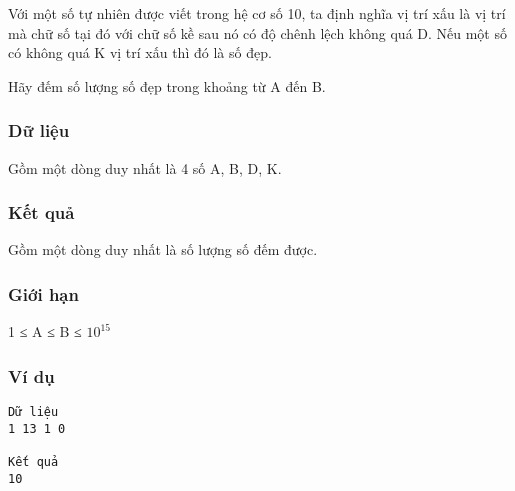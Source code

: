 



   Với một số tự nhiên được viết trong hệ cơ số 10, ta định nghĩa vị trí xấu là vị trí mà chữ số tại đó với chữ số kề sau nó có độ chênh lệch không quá D. Nếu một số có không quá K vị trí xấu thì đó là số đẹp.  

   Hãy đếm số lượng số đẹp trong khoảng từ A đến B.  

\subsubsection{   Dữ liệu  }

   Gồm một dòng duy nhất là 4 số A, B, D, K.  

\subsubsection{   Kết quả  }

   Gồm một dòng duy nhất là số lượng số đếm được.  

\subsubsection{   Giới hạn  }

   1 ≤ A ≤ B ≤ $10^{15}$

\subsubsection{   Ví dụ  }
\begin{verbatim}
Dữ liệu
1 13 1 0

Kết quả
10
\end{verbatim}

